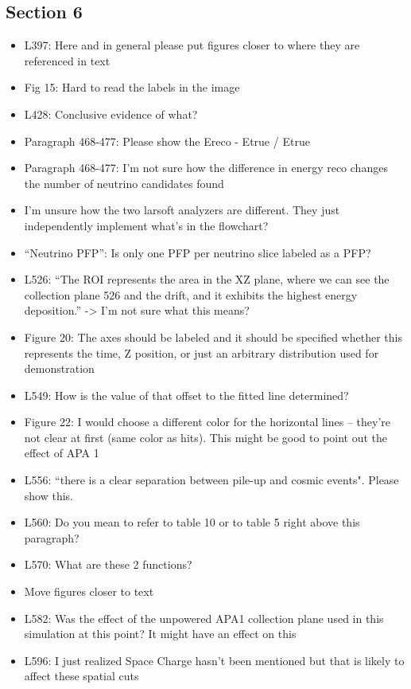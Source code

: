 \documentclass[11pt]{article}
\begin{document}
\subsection*{Section 6}
\begin{itemize}
    \item L397: Here and in general please put figures closer to where they are referenced in text 
    \item Fig 15: Hard to read the labels in the image
    \item L428: Conclusive evidence of what?
    \item Paragraph 468-477: Please show the Ereco - Etrue / Etrue
    \item Paragraph 468-477: I’m not sure how the difference in energy reco changes the number of neutrino candidates found
    \item I’m unsure how the two larsoft analyzers are different. They just independently implement what’s in the flowchart?
    \item “Neutrino PFP”: Is only one PFP per neutrino slice labeled as a PFP? 
    \item L526: “The ROI represents the area in the XZ plane, where we can see the collection plane 526 and the drift, and it exhibits the highest energy deposition.” -> I’m not sure what this means?
    \item Figure 20: The axes should be labeled and it should be specified whether this represents the time, Z position, or just an arbitrary distribution used for demonstration
    \item L549: How is the value of that offset to the fitted line determined?
    \item Figure 22: I would choose a different color for the horizontal lines – they’re not clear at first (same color as hits). This might be good to point out the effect of APA 1
    \item L556: “there is a clear separation between pile-up and cosmic events". Please show this.
    \item L560: Do you mean to refer to table 10 or to table 5 right above this paragraph?
    \item L570: What are these 2 functions?
    \item Move figures closer to text
    \item L582: Was the effect of the unpowered APA1 collection plane used in this simulation at this   point? It might have an effect on this 
    \item L596: I just realized Space Charge hasn’t been mentioned but that is likely to affect these spatial cuts
\end{itemize}
\end{document}

